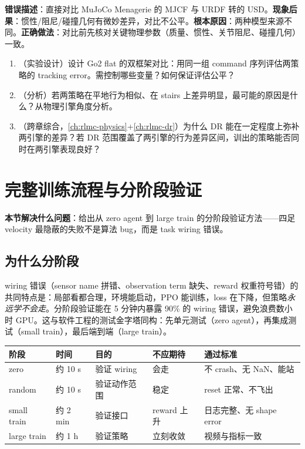 \begin{pitfall}
\textbf{错误描述}：直接对比 MuJoCo Menagerie 的 MJCF 与 URDF 转的 USD。\textbf{现象后果}：惯性/阻尼/碰撞几何有微妙差异，对比不公平。\textbf{根本原因}：两种模型来源不同。\textbf{正确做法}：对比前先核对关键物理参数（质量、惯性、关节阻尼、碰撞几何）一致。
\end{pitfall}

\begin{practice}[三框架对比]
\begin{enumerate}
\item （实验设计）设计 Go2 flat 的双框架对比：用同一组 command 序列评估两策略的 tracking error。需控制哪些变量？如何保证评估公平？
\item （分析）若两策略在平地行为相似、在 stairs 上差异明显，最可能的原因是什么？从物理引擎角度分析。
\item （跨章综合，\cref{ch:rlmc-physics}+\cref{ch:rlmc-dr}）为什么 DR 能在一定程度上弥补两引擎的差异？若 DR 范围覆盖了两引擎的行为差异区间，训出的策略能否同时在两引擎表现良好？
\end{enumerate}
\end{practice}

\section{完整训练流程与分阶段验证}
\label{sec:rlmc-ql-train}

\textbf{本节解决什么问题}：给出从 zero agent 到 large train 的分阶段验证方法——四足 velocity 最隐蔽的失败不是算法 bug，而是 task wiring 错误。

\subsection{为什么分阶段}
\label{sec:rlmc-ql-train-why}

wiring 错误（sensor name 拼错、observation term 缺失、reward 权重符号错）的共同特点是：局部看都合理，环境能启动，PPO 能训练，loss 在下降，但策略\emph{永远学不会走}。分阶段验证能在 5 分钟内暴露 90\% 的 wiring 错误，避免浪费数小时 GPU。这与软件工程的测试金字塔同构：先单元测试（zero agent），再集成测试（small train），最后端到端（large train）。

\begin{center}
\small
\begin{tabular}{@{}lllll@{}}
\toprule
阶段 & 时间 & 目的 & 不应期待 & 通过标准 \\
\midrule
zero & 约 10 s & 验证 wiring & 会走 & 不 crash、无 NaN、能站 \\
random & 约 10 s & 验证动作范围 & 稳定 & reset 正常、不飞出 \\
small train & 约 2 min & 验证接口 & reward 上升 & 日志完整、无 shape error \\
large train & 约 1 h & 验证策略 & 立刻收敛 & 视频与指标一致 \\
\bottomrule
\end{tabular}
\end{center}

